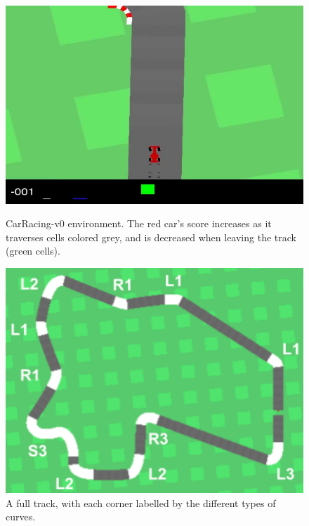\documentclass{article}
\begin{document}
\begin{figure}[!h]
\captionsetup{justification=centering}
\centering
\begin{minipage}[t]{.3\textwidth}
  \centering
  \includegraphics[width=\linewidth]{Graphics/carracing.jpg}
  \caption{CarRacing-v0 environment. The red car's score increases as
    it traverses cells colored grey, and is decreased when leaving the
  track (green cells).}
  \label{fig:curves_comparison}
\end{minipage}
\hspace{.25cm}
\begin{minipage}[t]{.3\textwidth}
  \centering
  \includegraphics[width=\linewidth]{Graphics/curves.png}
  \caption{A full track, with each corner labelled by the different
    types of curves.} 
  \label{fig:curves}
\end{minipage}

\end{figure}
\end{document}
